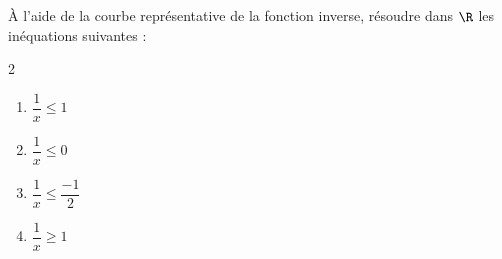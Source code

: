 \begin{exo}{}
	À l'aide de la courbe représentative de la fonction inverse, résoudre dans $\R$ les inéquations suivantes :
	\vspace*{-2mm}
	\begin{multicols}{2}
	\begin{enumerate}[itemsep=2mm]
		\item $\dfrac{1}{x} \le 1$
		\item $\dfrac{1}{x} \le 0$
		\item $\dfrac{1}{x} \le \dfrac{-1}{2}$
		\item $\dfrac{1}{x} \ge 1$
	\end{enumerate}
	\end{multicols}\vspace*{-2mm}
\end{exo}
